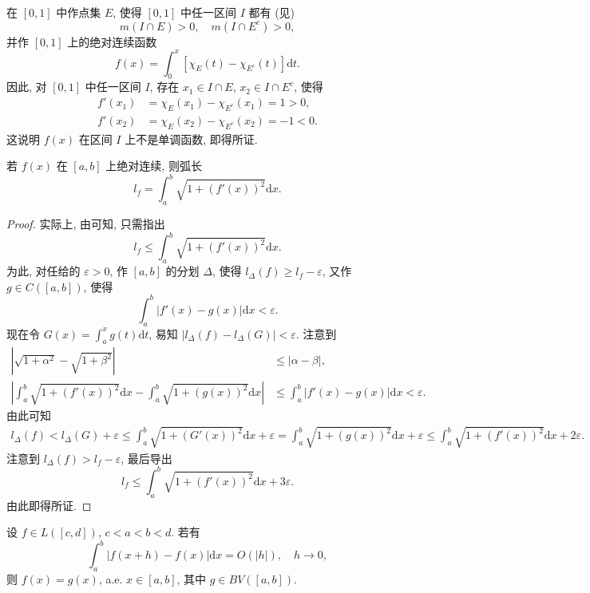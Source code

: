 \documentclass[../../main.tex]{subfiles}%
\begin{document}
\begin{example}[无处单调的绝对连续函数]
在 $[0,1]$ 中作点集 $E$, 使得 $[0,1]$ 中任一区间 $I$ 都有 (见)
\[
m(I\cap E) > 0,\quad m(I\cap E^c) > 0,
\]
并作 $[0,1]$ 上的绝对连续函数
\[
f(x) = \int_0^x [\chi_E(t) - \chi_{E^c}(t)]\mathrm{d}t.
\]
因此, 对 $[0,1]$ 中任一区间 $I$, 存在 $x_1\in I\cap E$, $x_2\in I\cap E^c$, 使得
\begin{align*}
f'(x_1) &= \chi_E(x_1) - \chi_{E^c}(x_1) = 1 > 0, \\
f'(x_2) &= \chi_E(x_2) - \chi_{E^c}(x_2) = -1 < 0.
\end{align*}
这说明 $f(x)$ 在区间 $I$ 上不是单调函数, 即得所证.
\end{example}

\begin{example}
若 $f(x)$ 在 $[a,b]$ 上绝对连续, 则弧长
\[
l_f = \int_a^b \sqrt{1+(f'(x))^2}\mathrm{d}x.
\]
\end{example}
\begin{proof}
实际上, 由可知, 只需指出
\[
l_f \leqslant \int_a^b \sqrt{1+(f'(x))^2}\mathrm{d}x.
\]
为此, 对任给的 $\varepsilon>0$, 作 $[a,b]$ 的分划 $\Delta$, 使得 $l_\Delta(f)\geqslant l_f-\varepsilon$, 又作 $g\in C([a,b])$, 使得
\[
\int_a^b |f'(x)-g(x)|\mathrm{d}x < \varepsilon.
\]
现在令 $G(x) = \int_a^x g(t)\mathrm{d}t$, 易知 $|l_\Delta(f)-l_\Delta(G)| < \varepsilon$. 注意到
\begin{align*}
|\sqrt{1+\alpha^2}-\sqrt{1+\beta^2}| &\leqslant |\alpha-\beta|, \\
\left|\int_a^b \sqrt{1+(f'(x))^2}\mathrm{d}x - \int_a^b \sqrt{1+(g(x))^2}\mathrm{d}x\right|
&\leqslant \int_a^b |f'(x)-g(x)|\mathrm{d}x < \varepsilon.
\end{align*}
由此可知
\begin{align*}
l_\Delta(f) < l_\Delta(G) + \varepsilon \leqslant \int_a^b \sqrt{1+(G'(x))^2}\mathrm{d}x + \varepsilon 
= \int_a^b \sqrt{1+(g(x))^2}\mathrm{d}x + \varepsilon \leqslant \int_a^b \sqrt{1+(f'(x))^2}\mathrm{d}x + 2\varepsilon.
\end{align*}
注意到 $l_\Delta(f) > l_f-\varepsilon$, 最后导出
\[
l_f \leqslant \int_a^b \sqrt{1+(f'(x))^2}\mathrm{d}x + 3\varepsilon.
\]
由此即得所证.
\end{proof}

\begin{example}
设 $f\in L([c,d])$, $c<a<b<d$. 若有
\[
\int_a^b |f(x+h)-f(x)|\mathrm{d}x = O(|h|),\quad h\to 0,
\]
则 $f(x)=g(x)$, a.e. $x\in[a,b]$, 其中 $g\in  BV([a,b])$.
\end{example}
\end{document}
